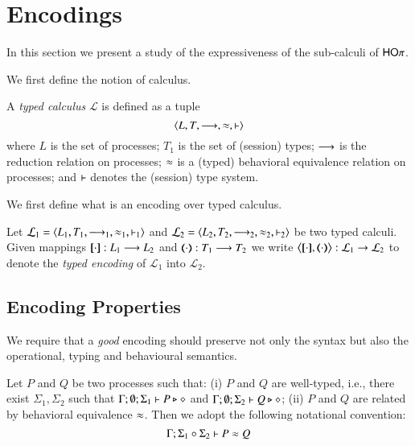 \newcommand{\enc}[2]{\big\langle\map{#1}, \mapt{#2}\big\rangle}
\newcommand{\encod}[3]{\lrangle{\map{#1}^{#3}, \mapt{#2}^{#3}}}

\newcommand{\calc}[5]{\lrangle{#1, #2, #3, #4, #5}}
\newcommand{\tyl}[1]{\ensuremath{\mathcal{#1}}}

\section{Encodings}

In this section we present a study of the expressiveness 
of the sub-calculi of $\mathsf{HO}\pi$.

We first define the notion of calculus.

\begin{definition}
	A \emph{typed calculus} $\tyl{L}$ is defined as a tuple $$\calc{L}{T}{\red}{\wb}{\proves}$$
	where $L$ is the set of processes; $T_1$ is the set of (session) types;
	$\longrightarrow$ is the reduction relation on processes; $\approx$ is a (typed) behavioral equivalence
	relation on processes; and $\vdash$ denotes the (session) type system.
\end{definition}

We first define what is an encoding over typed calculus.

\begin{definition}
	Let  $\tyl{L}_1 = \calc{L_1}{T_1}{\red_1}{\wb_1}{\proves_1}$
	and $\tyl{L}_2 =  \calc{L_2}{T_2}{\red_2}{\wb_2}{\proves_2}$ be two typed calculi.
	Given mappings $[\!\![\cdot]\!\!]: L_1 \longrightarrow L_2$ and
	$(\!\!\langle\cdot\rangle\!\!): T_1 \longrightarrow T_2$
	we write 
	$\enc{\cdot}{\cdot} : \tyl{L}_1 \to \tyl{L}_2$ to denote the \emph{typed encoding} of $\tyl{L}_1$ into $\tyl{L}_2$.

\end{definition}

\subsection{Encoding Properties}

We require that a {\em good} encoding should 
preserve not only the syntax but
also the operational, typing and behavioural
semantics. 

\begin{definition}
Let $P$ and $Q$ be two processes such that: (i) $P$ and $Q$ are well-typed, i.e., 
there exist $\Sigma_1, \Sigma_2$ such that 
$\Gamma; \emptyset; \Sigma_1 \vdash P \triangleright \diamond$ 
and
$\Gamma; \emptyset; \Sigma_2 \vdash Q \triangleright \diamond$;
(ii) $P$ and $Q$ are related by behavioral equivalence $\approx$.
Then we adopt the following notational convention:
$$
\Gamma; \Sigma_1 \circ \Sigma_2 \vdash P \approx Q
$$

\end{definition}

